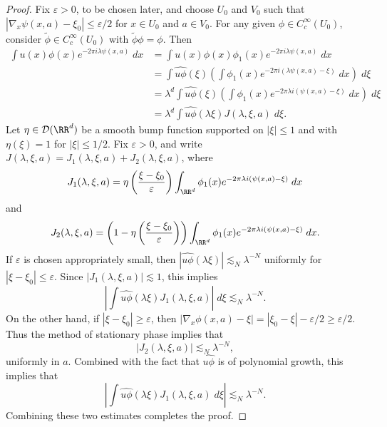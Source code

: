 \begin{proof}
    Fix $\varepsilon > 0$, to be chosen later, and choose $U_0$ and $V_0$ such that $|\nabla_x \psi(x,a) - \xi_0| \leq \varepsilon/2$ for $x \in U_0$ and $a \in V_0$. For any given $\phi \in C_c^\infty(U_0)$, consider $\tilde{\phi} \in C_c^\infty(U_0)$ with $\tilde{\phi} \phi = \phi$. Then
    \begin{align*}
        \int u(x) \phi(x) e^{-2 \pi i \lambda \psi(x,a)}\; dx &= \int u(x) \phi(x) \phi_1(x) e^{-2 \pi i \lambda \psi(x,a)}\; dx\\
        &= \int \widehat{u \phi}(\xi) \left( \int \phi_1(x) e^{-2 \pi i (\lambda \psi(x,a) - \xi)}\; dx \right)\; d\xi\\
        &= \lambda^d \int \widehat{u \phi}(\xi) \left( \int \phi_1(x) e^{-2 \pi \lambda i(\psi(x,a) - \xi)}\; dx \right)\; d\xi\\
        &= \lambda^d \int \widehat{u \phi}(\lambda \xi) J(\lambda,\xi,a)\; d\xi.
    \end{align*}
    Let $\eta \in \mathcal{D}(\RR^d)$ be a smooth bump function supported on $|\xi| \leq 1$ and with $\eta(\xi) = 1$ for $|\xi| \leq 1/2$. Fix $\varepsilon > 0$, and write $J(\lambda,\xi,a) = J_1(\lambda,\xi,a) + J_2(\lambda,\xi,a)$, where
    \[ J_1(\lambda,\xi,a) = \eta \left( \frac{\xi - \xi_0}{\varepsilon} \right) \int_{\RR^d} \phi_1(x) e^{-2 \pi \lambda i(\psi(x,a) - \xi)}\; dx \]
    and
    \[ J_2(\lambda,\xi,a) = \left(1 - \eta \left( \frac{\xi - \xi_0}{\varepsilon} \right) \right) \int_{\RR^d} \phi_1(x) e^{-2 \pi \lambda i (\psi(x,a) - \xi)}\; dx. \]
    If $\varepsilon$ is chosen appropriately small, then $|\widehat{u \phi}(\lambda \xi)| \lesssim_N \lambda^{-N}$ uniformly for $|\xi - \xi_0| \leq \varepsilon$. Since $|J_1(\lambda,\xi,a)| \lesssim 1$, this implies
    \[ \left| \int \widehat{u \phi}(\lambda \xi) J_1(\lambda,\xi,a) \right|\; d\xi \lesssim_N \lambda^{-N}. \]
    On the other hand, if $|\xi - \xi_0| \geq \varepsilon$, then $|\nabla_x \phi(x,a) - \xi| = |\xi_0 - \xi| - \varepsilon/2 \geq \varepsilon/2$. Thus the method of stationary phase implies that
    \[ |J_2(\lambda,\xi,a)| \lesssim_N \lambda^{-N}, \]
    uniformly in $a$. Combined with the fact that $\widehat{u \phi}$ is of polynomial growth, this implies that
    \[ \left| \int \widehat{u \phi}(\lambda \xi) J_1(\lambda,\xi,a)\; d\xi \right| \lesssim_N \lambda^{-N}. \]
    Combining these two estimates completes the proof.
\end{proof}

